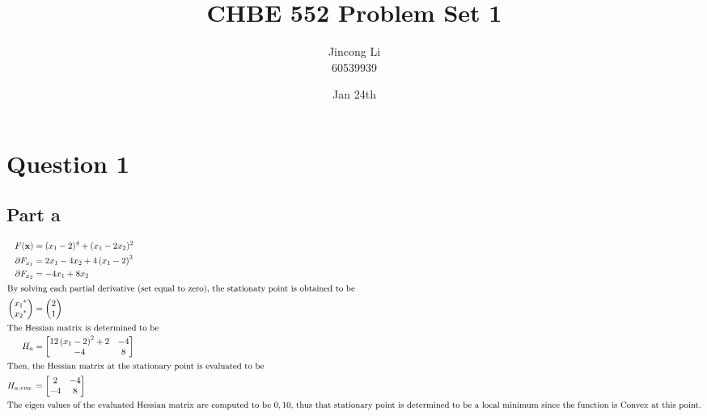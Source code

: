 \documentclass[a4paper,12pt]{article} %
\begin{document}
\newcommand{\vect}[1]{\mathbf{#1}}

\title{CHBE 552 Problem Set 1}
\author{Jincong Li \\ 60539939}
\date{Jan 24th}
\maketitle

\section{\textbf{Question 1}}

\subsection{Part a}

\begin{align*}
F( \vect{x} )  &= (x_1 - 2)^4 + (x_1-2x_2)^2 \\
\partial F_{x_1} &= 2 x_{1} - 4 x_{2} + 4 \left(x_{1} - 2\right)^{3} \\
\partial F_{x_2} &= -4x_1 + 8x_2\\
\intertext{By solving each partial derivative (set equal to zero), the stationaty point is obtained to be}
\begin{pmatrix} 
{x_1}^* \\ {x_2}^* 
\end{pmatrix}
&= 
\begin{pmatrix} 
2\\1
\end{pmatrix}
\\
\intertext{The Hessian matrix is determined to be}
H_a &= \left[\begin{matrix}12 \left(x_{1} - 2\right)^{2} + 2 & -4\\-4 & 8\end{matrix}\right]\\
\intertext{Then, the Hessian matrix at the stationary point is evaluated to be}
H_{a,eva.}&=\left[\begin{matrix}2 & -4\\-4 & 8\end{matrix}\right]\\
\intertext{The eigen values of the evaluated Hessian matrix are computed to be $0, 10$, thus that stationary point is determined to be a local minimum since the function is Convex at this point.}
\end{align*}
\end{document}
